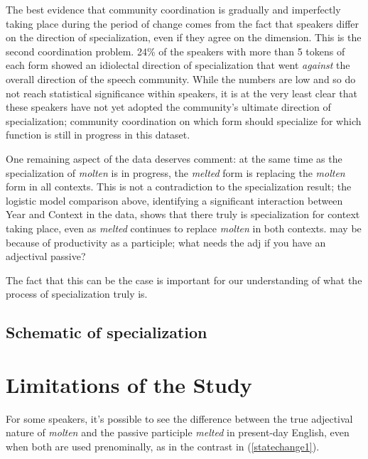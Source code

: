 \documentclass{artikel3}
\begin{document}
The best evidence that community coordination is gradually and imperfectly taking place during the period of change comes from the fact that speakers differ on the direction of specialization, even if they agree on the dimension. This is the second coordination problem. 24\% of the speakers with more than 5 tokens of each form showed an idiolectal direction of specialization that went \textsl{against} the overall direction of the speech community. While the numbers are low and so do not reach statistical significance within speakers, it is at the very least clear that these speakers have not yet adopted the community's ultimate direction of specialization; community coordination on which form should specialize for which function is still in progress in this dataset.

One remaining aspect of the data deserves comment: at the same time as the specialization of \textsl{molten} is in progress, the \textsl{melted} form is replacing the \textsl{molten} form in all contexts. This is not a contradiction to the specialization result; the logistic model comparison above, identifying a significant interaction between Year and Context in the data, shows that there truly is specialization for context taking place, even as \textsl{melted} continues to replace \textsl{molten} in both contexts. may be because of productivity as a participle; what needs the adj if you have an adjectival passive?

The fact that this can be the case is important for our understanding of what the process of specialization truly is.


\subsection{Schematic of specialization}


\section{Limitations of the Study}
\label{limitations}


For some speakers, it's possible to see the difference between the true adjectival nature of \textsl{molten} and the passive participle \textsl{melted} in present-day English, even when both are used prenominally, as in the contrast in (\ref{statechange1}). 
\end{document}
